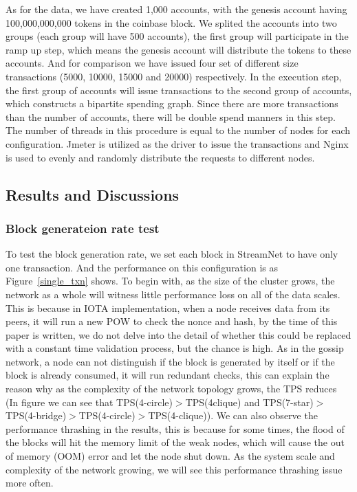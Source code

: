 As for the data, we have created 1,000 accounts, with the genesis account having 100,000,000,000 tokens in the coinbase block.
We splited the accounts into two groups (each group will have 500 accounts), the first group will participate in the ramp up step, which means the genesis account will distribute the tokens to these accounts.
And for comparison we have issued four set of different size transactions (5000, 10000, 15000 and 20000) respectively.
In the execution step, the first group of accounts will issue transactions to the second group of accounts, which constructs a bipartite spending graph. 
Since there are more transactions than the number of accounts, there will be double spend manners in this step.
The number of threads in this procedure is equal to the number of nodes for each configuration.
Jmeter is utilized as the driver to issue the transactions and Nginx is used to evenly and randomly distribute the requests to different nodes.

\subsection {Results and Discussions}

\subsubsection {Block generateion rate test}
To test the block generation rate, we set each block in StreamNet to have only one transaction.
And the performance on this configuration is as Figure~\ref{single_txn} shows.
To begin with, as the size of the cluster grows, the network as a whole will witness little performance loss on all of the data scales. 
This is because in IOTA implementation, when a node receives data from its peers, it will run a new POW to check the nonce and hash, by the time of this paper is written, 
we do not delve into the detail of whether this could be replaced with a constant time validation process, but the chance is high.
As in the gossip network, a node can not distinguish if the block is generated by itself or if the block is already consumed, it will run redundant checks, this can explain
the reason why as the complexity of the network topology grows, the TPS reduces (In figure we can see that TPS(4-circle)$>$TPS(4\-clique) and TPS(7-star)$>$TPS(4-bridge)$>$TPS(4-circle)$>$TPS(4-clique)).  
We can also observe the performance thrashing in the results, 
this is because for some times, the flood of the blocks will hit the memory limit of the weak nodes, which will cause the out of memory (OOM) error and let the node shut down. 
As the system scale and complexity of the network growing, we will see this performance thrashing issue more often.

